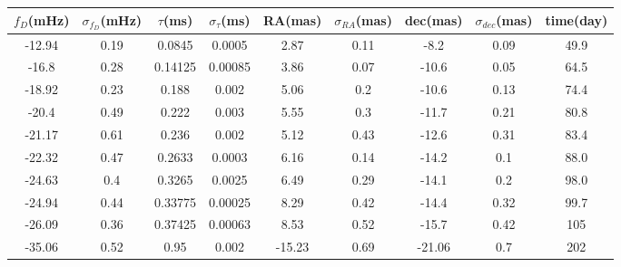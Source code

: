 \documentclass[useAMS,usenatbib]{mn2e}
\begin{document}
\begin{table}
\centering
\begin{tabular}{|c|c|c|c|c|c|c|c|c|}
\hline
$f_D$(mHz) & $\sigma_{f_D}$(mHz) & $\tau$(ms) & $\sigma_{\tau}$(ms) & RA(mas) & $\sigma_{RA}$(mas) & dec(mas) & $\sigma_{dec}$(mas) & time(day)\\
\hline
-12.94                            & 0.19      & 0.0845  & 0.0005          & 2.87    & 0.11                                     & -8.2     & 0.09      & 49.9                                \\

-16.8                             & 0.28      & 0.14125 & 0.00085         & 3.86    & 0.07                                     & -10.6    & 0.05      &64.5                                \\

-18.92                            & 0.23      & 0.188   & 0.002           & 5.06    & 0.2                                      & -10.6    & 0.13      &74.4                        \\

-20.4                             & 0.49      & 0.222   & 0.003           & 5.55    & 0.3                                      & -11.7    & 0.21      &80.8                                \\

-21.17                            & 0.61      & 0.236   & 0.002           & 5.12    & 0.43                                     & -12.6    & 0.31      &83.4                                \\

-22.32                            & 0.47      & 0.2633  & 0.0003          & 6.16    & 0.14                                     & -14.2    & 0.1       &88.0                                \\

-24.63                            & 0.4       & 0.3265  & 0.0025          & 6.49    & 0.29                                     & -14.1    & 0.2       &98.0                                \\

-24.94                            & 0.44      & 0.33775 & 0.00025         & 8.29    & 0.42                                     & -14.4    & 0.32      &99.7                                \\

-26.09                            & 0.36      & 0.37425 & 0.00063         & 8.53    & 0.52                                     & -15.7    & 0.42      &105                               
\\ \hline 
-35.06                           & 0.52                               & 0.95               & 0.002                              & -15.23  & 0.69                                     & -21.06   & 0.7   &202                                   \\


\end{tabular}
\end{table}
\end{document}
